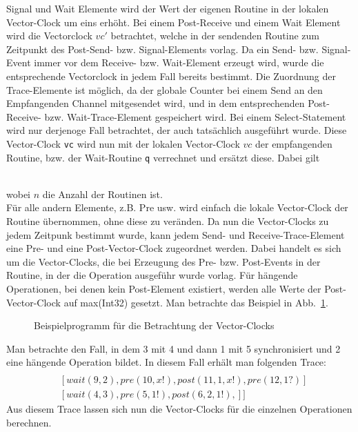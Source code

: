 Signal und Wait Elemente wird der Wert der eigenen Routine in der lokalen Vector-Clock um eins 
erhöht. Bei einem Post-Receive und einem Wait Element wird die Vectorclock $vc'$ betrachtet, 
welche in der sendenden Routine zum Zeitpunkt des Post-Send- bzw. Signal-Elements vorlag. 
Da ein Send- bzw. Signal-Event immer vor dem Receive- bzw. Wait-Element erzeugt wird, wurde 
die entsprechende Vectorclock in jedem Fall bereits bestimmt. Die Zuordnung der Trace-Elemente 
ist möglich, da der globale Counter bei einem Send an den Empfangenden Channel mitgesendet 
wird, und in dem entsprechenden Post-Receive- bzw. Wait-Trace-Element gespeichert wird.
Bei einem Select-Statement wird nur derjenoge Fall betrachtet, der auch tatsächlich ausgeführt wurde.
Diese Vector-Clock \texttt{vc}
wird nun mit der lokalen Vector-Clock $vc$ der empfangenden Routine, bzw. der Wait-Routine 
\texttt{q} verrechnet und ersätzt diese. Dabei gilt\\
\begin{figure}[h]
  \centering
  
\end{figure}\\
wobei $n$ die Anzahl der Routinen ist.\\
Für alle andern Elemente, z.B. Pre usw. wird einfach die lokale Vector-Clock der Routine übernommen, 
ohne diese zu veränden. Da nun die Vector-Clocks zu jedem Zeitpunk bestimmt wurde, kann jedem 
Send- und Receive-Trace-Element eine Pre- und eine Post-Vector-Clock zugeordnet werden. 
Dabei handelt es sich um die Vector-Clocks, die bei Erzeugung des Pre- bzw. Post-Events in 
der Routine, in der die Operation ausgeführ wurde vorlag. Für hängende Operationen, 
bei denen kein Post-Element existiert, werden alle Werte der Post-Vector-Clock auf 
max(Int32) gesetzt.
Man betrachte das Beispiel in Abb.~\ref{Chap:Analyze-Sec:Channel-SubSec:Dangling-Fig:PorgVC}.
\begin{figure}[h!]
  
  \caption{Beispielprogramm für die Betrachtung der Vector-Clocks}
  \label{Chap:Analyze-Sec:Channel-SubSec:Dangling-Fig:PorgVC}
\end{figure}
Man betrachte den Fall, in dem 3 mit 4 und dann 1 mit 5 synchronisiert und 2 eine hängende Operation bildet.
In diesem Fall erhält man folgenden Trace:
\begin{align}
  [&[signal(1, 2), signale(2, 3), pre(1, x?), post(7, 1, x?, 6), pre(8, x?), post(13, 1, x?, 11)]\\
  &[wait(9, 2), pre(10, x!), post(11, 1, x!), pre(12, 1?)]\\
  &[wait(4, 3), pre(5, 1!), post(6, 2, 1!),]
  ]
\end{align}
Aus diesem Trace lassen sich nun die Vector-Clocks für die einzelnen Operationen berechnen. 
